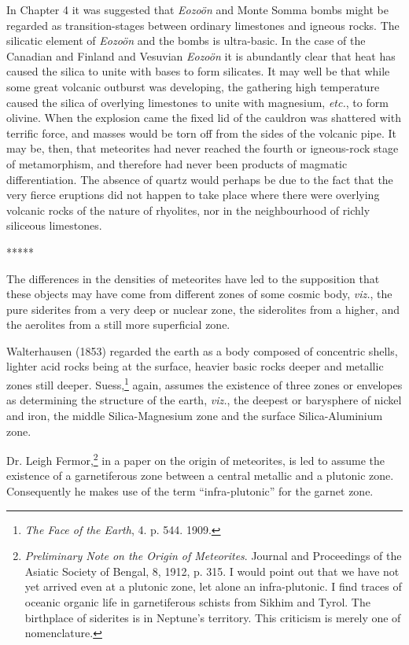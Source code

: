 \documentclass[a4paper, 12pt, oneside, landscape]{article}
\begin{document}
In Chapter 4 it was suggested that \emph{Eozoön} and Monte Somma bombs might be regarded as transition-stages between ordinary limestones and igneous rocks. The silicatic element of \emph{Eozoön} and the bombs is ultra-basic. In the case of the Canadian and Finland and Vesuvian \emph{Eozoön} it is abundantly clear that heat has caused the silica to unite with bases to form silicates. It may well be that while some great volcanic outburst was developing, the gathering high temperature caused the silica of overlying limestones to unite with magnesium, \emph{etc.}, to form olivine. When the explosion came the fixed lid of the cauldron was shattered with terrific force, and masses would be torn off from the sides of the volcanic pipe. It may be, then, that meteorites had never reached the fourth or igneous-rock stage of metamorphism, and therefore had never been products of magmatic differentiation. The absence of quartz would perhaps be due to the fact that the very fierce eruptions did not happen to take place where there were overlying volcanic rocks of the nature of rhyolites, nor in the neighbourhood of richly siliceous limestones.

\centerline{*\hspace{15mm}*\hspace{15mm}*\hspace{15mm}*\hspace{15mm}*}
\bigskip

The differences in the densities of meteorites have led to the supposition that these objects may have come from different zones of some cosmic body, \emph{viz.}, the pure siderites from a very deep or nuclear zone, the siderolites from a higher, and the aerolites from a still more superficial zone.

Walterhausen (1853) regarded the earth as a body composed of concentric shells, lighter acid rocks being at the surface, heavier basic rocks deeper and metallic zones still deeper. Suess,\footnote{\emph{The Face of the Earth}, 4. p. 544. 1909.} again, assumes the existence of three zones or envelopes as determining the structure of the earth, \emph{viz.}, the deepest or barysphere of nickel and iron, the middle Silica-Magnesium zone and the surface Silica-Aluminium zone.

Dr. Leigh Fermor,\footnote{\emph{Preliminary Note on the Origin of Meteorites}. Journal and Proceedings of the Asiatic Society of Bengal, 8, 1912, p. 315. I would point out that we have not yet arrived even at a plutonic zone, let alone an infra-plutonic. I find traces of oceanic organic life in garnetiferous schists from Sikhim and Tyrol. The birthplace of siderites is in Neptune's territory. This criticism is merely one of nomenclature.} in a paper on the origin of meteorites, is led to assume the existence of a garnetiferous zone between a central metallic and a plutonic zone. Consequently he makes use of the term ``infra-plutonic'' for the garnet zone.
\end{document}
